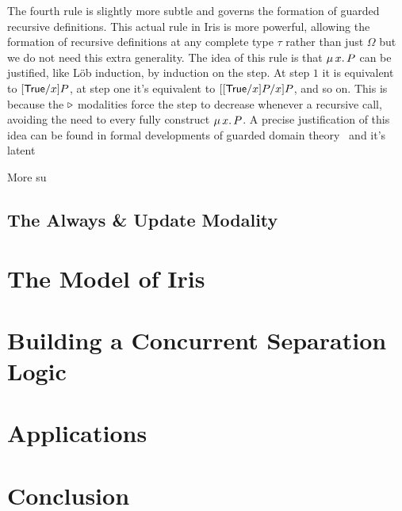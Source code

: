 \documentclass{amsart}
\begin{document}
The fourth rule is slightly more subtle and governs the formation of
guarded recursive definitions. This actual rule in Iris is more
powerful, allowing the formation of recursive definitions at any
complete type $\tau$ rather than just $\Omega$ but we do not need this
extra generality. The idea of this rule is that $\MU x. P$ can be
justified, like L\"ob induction, by induction on the step. At step $1$
it is equivalent to $[\textsf{True}/x]P$, at step one it's equivalent to
$[[\textsf{True}/x]P/x]P$, and so on. This is because the $\mathop{{\triangleright}}$ modalities
force the step to decrease whenever a recursive call, avoiding the
need to every fully construct $\MU x. P$. A precise justification of
this idea can be found in formal developments of guarded domain
theory~\citep{Birkedal:10,Birkdel:11} and it's latent

More su

\subsection{The Always \& Update Modality}\label{subsec:always}

\section{The Model of Iris}\label{sec:model}

\section{Building a Concurrent Separation Logic}\label{sec:encoding}

\section{Applications}\label{sec:applications}

\section{Conclusion}\label{sec:conclusions}



{}
\end{document}
